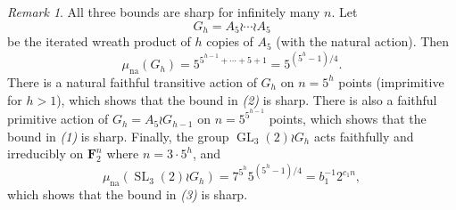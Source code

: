 \documentclass[11pt,reqno]{amsart}
\numberwithin{equation}{section}
\theoremstyle{definition}
\theoremstyle{remark}
\newtheorem{remark}[theorem]{Remark}
\def\F{\mathbf{F}} %
\newcommand\opr[1]{\operatorname{#1}}
\def\GL{\opr{GL}}
\def\SL{\opr{SL}}
\def\muna{\mu_{\opr{na}}}
\numberwithin{equation}{section}
\begin{document}
\begin{remark}
    All three bounds are sharp for infinitely many $n$. Let
    \[
        G_h = A_5 \wr \cdots \wr A_5
    \]
    be the iterated wreath product of $h$ copies of $A_5$ (with the natural action).
    Then
    \[
        \muna(G_h) = 5^{5^{h-1} + \cdots + 5 + 1} = 5^{(5^h - 1) / 4}.
    \]
    There is a natural faithful transitive action of $G_h$ on $n = 5^h$ points (imprimitive for $h > 1$), which shows that the bound in \emph{(2)} is sharp.
    There is also a faithful primitive action of $G_h = A_5 \wr G_{h-1}$ on $n = 5^{5^{h-1}}$ points,
    which shows that the bound in \emph{(1)} is sharp.
    Finally, the group $\GL_3(2) \wr G_h$ acts faithfully and irreducibly on $\F_2^n$ where $n = 3 \cdot 5^h$, and
    \[
        \muna(\SL_3(2) \wr G_h) = 7^{5^h} 5^{(5^h-1) / 4} = b_1^{-1} 2^{c_1 n},
    \]
    which shows that the bound in \emph{(3)} is sharp.
\end{remark}
\end{document}
